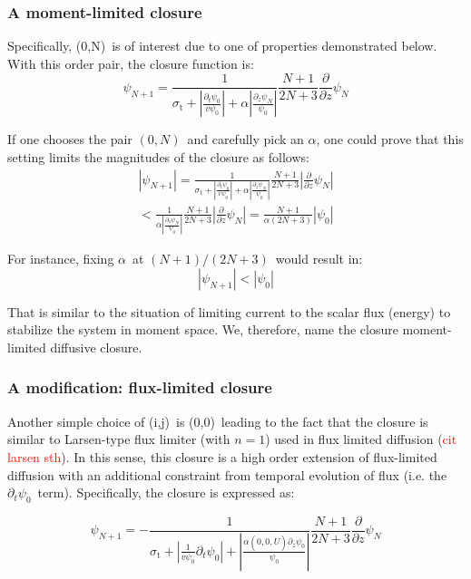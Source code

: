 \documentclass[review]{elsarticle}
\newcommand{\ppz}{\frac{\partial}{\partial z}}
\newcommand{\psii}[1]{\psi_\ensuremath{{#1}}}
\begin{document}
\subsubsection{A moment-limited closure}
Specifically, (0,N)~is of interest due to one of properties demonstrated below. With this order pair, the closure function is:
\begin{equation}
\psi_{N+1}=\frac{1}{\sigma_\mathrm{t}+\displaystyle|\frac{\partial_t\psii{0}}{v\psii{0}}|+\alpha|\frac{\partial_z\psii{N}}{\psii{0}}|}\frac{N+1}{2N+3}\ppz\psii{N}
\end{equation}

If one chooses the pair $(0,N)$~and carefully pick an $\alpha$, one could prove that this setting limits the magnitudes of the closure as follows:
\begin{align}
|\psi_{N+1}|=\frac{1}{\sigma_\mathrm{t}+\displaystyle|\frac{\partial_t\psii{0}}{v\psii{0}}|+\alpha|\frac{\partial_z\psii{N}}{\psii{0}}|}\frac{N+1}{2N+3}|\ppz\psii{N}|\\\nonumber
<\frac{1}{\displaystyle\alpha|\frac{\partial_z\psii{N}}{\psii{0}}|}\frac{N+1}{2N+3}|\ppz\psii{N}|=\frac{N+1}{\alpha(2N+3)}|\psi_0|
\end{align}

For instance, fixing $\alpha$~at $(N+1)/(2N+3)$~would result in:
\begin{equation}
|\psii{N+1}|<|\psii{0}|
\end{equation}

That is similar to the situation of limiting current to the scalar flux (energy) to stabilize the system in moment space. We, therefore, name the closure moment-limited diffusive closure.

\subsubsection{A modification: flux-limited closure}
Another simple choice of (i,j)~is (0,0)~leading to the fact that the closure is similar to Larsen-type flux limiter (with $n=1$) used in flux limited diffusion (\textcolor{red}{cit larsen sth}). In this sense, this closure is a high order extension of flux-limited diffusion with an additional constraint from temporal evolution of flux (i.e. the $\partial_t\psii{0}$~term). Specifically, the closure is expressed as:

\begin{equation}\label{closure3}
\psii{N+1}=-\frac{1}{\sigma_\mathrm{t}+\displaystyle|\frac{1}{v\psii{0}}\partial_t\psii{0}|+|\frac{\alpha(0,0,\hat{U})\partial_z\psii{0}}{\psii{0}}|}\frac{N+1}{2N+3}\ppz\psii{N}
\end{equation}
\end{document}
